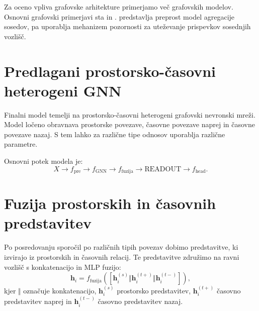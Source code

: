 Za oceno vpliva grafovske arhitekture primerjamo več grafovskih modelov.
Osnovni grafovski primerjavi sta \GCN{} in \GAT{}.
\GCN{} predstavlja preprost model agregacije sosedov, \GAT{} pa uporablja mehanizem pozornosti za uteževanje prispevkov sosednjih vozlišč.


\section{Predlagani prostorsko-časovni heterogeni GNN}
\label{subsec:finalni-gnn}

Finalni model temelji na prostorsko-časovni heterogeni grafovski nevronski mreži.
Model ločeno obravnava prostorske povezave, časovne povezave naprej in časovne povezave nazaj.
S tem lahko za različne tipe odnosov uporablja različne parametre.

Osnovni potek modela je:
\begin{equation}
    X
    \rightarrow
    f_{\text{pre}}
    \rightarrow
    f_{\text{GNN}}
    \rightarrow
    f_{\text{fuzija}}
    \rightarrow
    \text{READOUT}
    \rightarrow
    f_{\text{head}}.
\end{equation}


\section{Fuzija prostorskih in časovnih predstavitev}
\label{subsec:fuzija}

Po posredovanju sporočil po različnih tipih povezav dobimo predstavitve, ki izvirajo iz prostorskih in časovnih relacij.
Te predstavitve združimo na ravni vozlišč s konkatenacijo in MLP fuzijo:
\begin{equation}
    \mathbf{h}_i =
    f_{\text{fuzija}}
    \left(
    \left[
    \mathbf{h}_{i}^{(s)}
    \Vert
    \mathbf{h}_{i}^{(t+)}
    \Vert
    \mathbf{h}_{i}^{(t-)}
    \right]
    \right),
\end{equation}
kjer $\Vert$ označuje konkatenacijo, $\mathbf{h}_{i}^{(s)}$ prostorsko predstavitev, $\mathbf{h}_{i}^{(t+)}$ časovno predstavitev naprej in $\mathbf{h}_{i}^{(t-)}$ časovno predstavitev nazaj.

